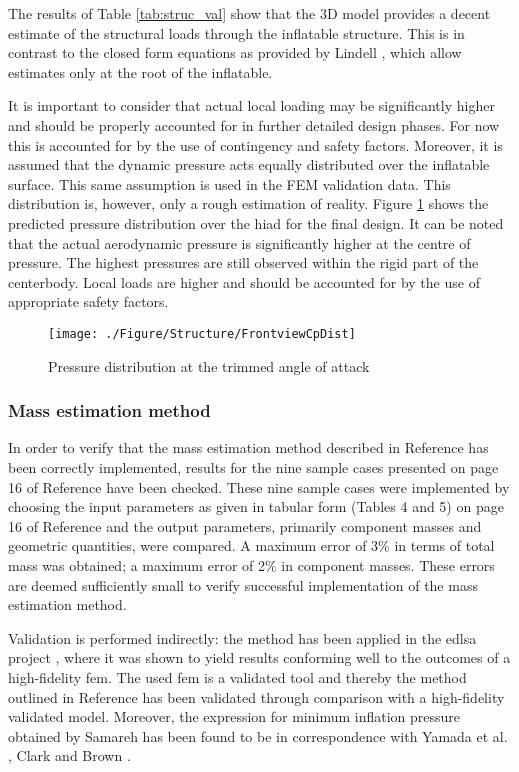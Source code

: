 The results of Table \ref{tab:struc_val} show that the 3D model provides a decent estimate of the structural loads through the inflatable structure. This is in contrast to the closed form equations as provided by Lindell \cite{Lindell2006}, which allow estimates only at the root of the inflatable. 

It is important to consider that actual local loading may be significantly higher and should be properly accounted for in further detailed design phases. For now this is accounted for by the use of contingency and safety factors. Moreover, it is assumed that the dynamic pressure acts equally distributed over the inflatable surface. This same assumption is used in the FEM validation data. This distribution is, however, only a rough estimation of reality. Figure \ref{fig:struc_pres} shows the predicted pressure distribution over the \gls{hiad} for the final design. It can be noted that the actual aerodynamic pressure is significantly higher at the centre of pressure. The highest pressures are still observed within the rigid part of the centerbody. Local loads are higher and should be accounted for by the use of appropriate safety factors.

\begin{figure}[h]
\centering
\texttt{[image: ./Figure/Structure/FrontviewCpDist]}
\caption{Pressure distribution at the trimmed angle of attack} 
\label{fig:struc_pres}
\end{figure}

\subsubsection{Mass estimation method}

In order to verify that the mass estimation method described in Reference \cite{Samareh2011} has been correctly implemented, results for the nine sample cases presented on page 16 of Reference \cite{Samareh2011} have been checked. These nine sample cases were implemented by choosing the input parameters as given in tabular form (Tables 4 and 5) on page 16 of Reference \cite{Samareh2011} and the output parameters, primarily component masses and geometric quantities, were compared. A maximum error of 3\% in terms of total mass was obtained; a maximum error of 2\% in component masses. These errors are deemed sufficiently small to verify successful implementation of the mass estimation method.

Validation is performed indirectly: the method \cite{Samareh2011} has been applied in the \gls{edlsa} project \cite{Cianciolo2010}, where it was shown to yield results conforming well to the outcomes of a high-fidelity \gls{fem}. The used \gls{fem} is a validated tool \cite{Cianciolo2010} and thereby the method outlined in Reference \cite{Samareh2011} has been validated through comparison with a high-fidelity validated model. Moreover, the expression for minimum inflation pressure obtained by Samareh has been found to be in correspondence with Yamada et al. \cite{Yamada2009}, Clark \cite{Clark2009} and Brown \cite{Brown2009}.



